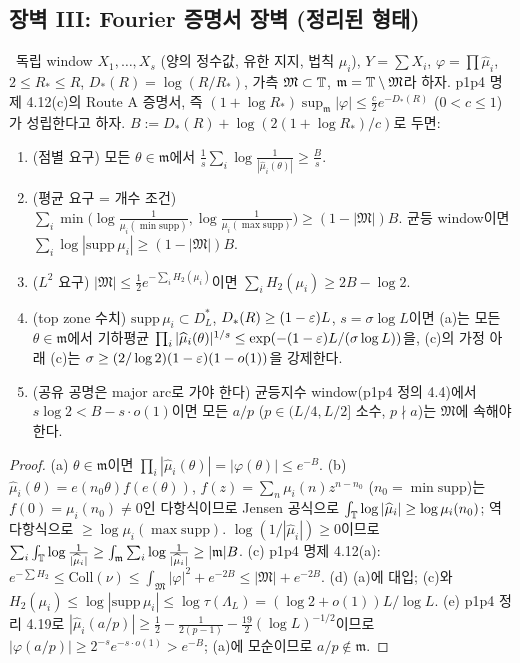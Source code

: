 \subsection{장벽 III: Fourier 증명서 장벽 (정리된 형태)}
\label{CORE:ssec-barrier3}

\begin{theorem}\label{CORE:thm-fourier}
\PROVED\ 독립 window $X_1,\dots,X_s$ (양의 정수값, 유한 지지, 법칙 $\mu_i$), $Y=\sum X_i$, $\varphi=\prod\widehat\mu_i$, $2\le R_*\le R$, $D_*(R)=\log(R/R_*)$, 가측 $\mathfrak M\subset\mathbb{T}$, $\mathfrak m=\mathbb{T}\setminus\mathfrak M$라 하자. p1p4 명제 4.12(c)의 Route A 증명서, 즉 $(1+\log R_*)\sup_{\mathfrak m}|\varphi|\le\frac c2e^{-D_*(R)}$ ($0<c\le1$)가 성립한다고 하자. $B:=D_*(R)+\log(2(1+\log R_*)/c)$로 두면:
\begin{enumerate}[label=(\alph*)]
\item (점별 요구) 모든 $\theta\in\mathfrak m$에서 $\frac1s\sum_i\log\frac1{|\widehat\mu_i(\theta)|}\ge\frac Bs$.
\item (평균 요구 = 개수 조건) $\sum_i\min\bigl(\log\frac1{\mu_i(\min\mathrm{supp})},\log\frac1{\mu_i(\max\mathrm{supp})}\bigr)\ge(1-|\mathfrak M|)B$. 균등 window이면 $\sum_i\log|\mathrm{supp}\,\mu_i|\ge(1-|\mathfrak M|)B$.
\item ($L^2$ 요구) $|\mathfrak M|\le\frac12e^{-\sum_iH_2(\mu_i)}$이면 $\sum_iH_2(\mu_i)\ge2B-\log2$.
\item (top zone 수치) $\mathrm{supp}\,\mu_i\subset D^*_L$, $D_*(R)\ge(1-\varepsilon)L$, $s=\sigma\log L$이면 (a)는 모든 $\theta\in\mathfrak m$에서 기하평균 $\prod_i|\widehat\mu_i(\theta)|^{1/s}\le\exp(-(1-\varepsilon)L/(\sigma\log L))$을, (c)의 가정 아래 (c)는 $\sigma\ge(2/\log2)(1-\varepsilon)(1-o(1))$을 강제한다.
\item (공유 공명은 major arc로 가야 한다) 균등지수 window(p1p4 정의 4.4)에서 $s\log2<B-s\cdot o(1)$이면 모든 $a/p$ ($p\in(L/4,L/2]$ 소수, $p\nmid a$)는 $\mathfrak M$에 속해야 한다.
\end{enumerate}
\end{theorem}
\begin{proof}
(a) $\theta\in\mathfrak m$이면 $\prod_i|\widehat\mu_i(\theta)|=|\varphi(\theta)|\le e^{-B}$.
(b) $\widehat\mu_i(\theta)=e(n_0\theta)f(e(\theta))$, $f(z)=\sum_n\mu_i(n)z^{n-n_0}$ ($n_0=\min\mathrm{supp}$)는 $f(0)=\mu_i(n_0)\ne0$인 다항식이므로 Jensen 공식으로 $\int_{\mathbb{T}}\log|\widehat\mu_i|\ge\log\mu_i(n_0)$; 역다항식으로 $\ge\log\mu_i(\max\mathrm{supp})$. $\log(1/|\widehat\mu_i|)\ge0$이므로 $\sum_i\int_{\mathbb{T}}\log\frac1{|\widehat\mu_i|}\ge\int_{\mathfrak m}\sum_i\log\frac1{|\widehat\mu_i|}\ge|\mathfrak m|B$.
(c) p1p4 명제 4.12(a): $e^{-\sum H_2}\le\mathrm{Coll}(\nu)\le\int_{\mathfrak M}|\varphi|^2+e^{-2B}\le|\mathfrak M|+e^{-2B}$.
(d) (a)에 대입; (c)와 $H_2(\mu_i)\le\log|\mathrm{supp}\,\mu_i|\le\log\tau(\Lambda_L)=(\log2+o(1))L/\log L$.
(e) p1p4 정리 4.19로 $|\widehat\mu_i(a/p)|\ge\frac12-\frac1{2(p-1)}-\frac{19}{2}(\log L)^{-1/2}$이므로 $|\varphi(a/p)|\ge2^{-s}e^{-s\cdot o(1)}>e^{-B}$; (a)에 모순이므로 $a/p\notin\mathfrak m$.
\end{proof}

